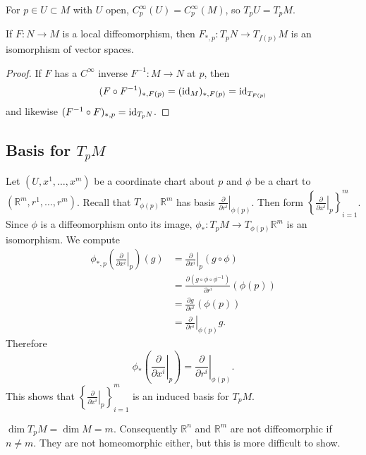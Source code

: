 \begin{remark}
For $p \in U \subset M$ with $U$ open,
$C_p^\infty(U) = C_p^\infty(M)$, so $T_pU = T_pM$.
\end{remark}

\begin{corol}
If $F: N \to M$ is a local diffeomorphism, then
$F_{\ast, p} : T_p N \to T_{f(p)} M$ is an isomorphism of vector spaces.
\end{corol}
\begin{proof}
If $F$ has a $C^\infty$ inverse $F^{-1} : M \to N$ at $p$, then
$$
    (F \circ F^{-1})_{\ast, F(p)}
  = (\mathrm{id}_M)_{\ast, F(p)}
  = \mathrm{id}_{T_{F(p)}}
$$
and likewise $(F^{-1} \circ F)_{\ast, p} = \mathrm{id}_{T_pN}$.
\end{proof}

\subsection{Basis for $T_pM$}
Let $(U, x^1, \dots, x^m)$ be a coordinate chart about $p$
and $\phi$ be a chart to $(\mathbb{R}^m, r^1, \dots, r^m)$.
Recall that $T_{\phi(p)} \mathbb{R}^m$ has basis
$\left.\frac{\partial}{\partial r^i}\right|_{\phi(p)}$.
Then form
$\left\{ \left.\frac{\partial}{\partial x^i}\right|_p \right\}_{i=1}^m$.
Since $\phi$ is a diffeomorphism onto its image,
$\phi_\ast : T_pM \to T_{\phi(p)} \mathbb{R}^m$ is an isomorphism. We
compute
\begin{align*}
   \phi_{\ast,p}
     \left(
       \left.
         \frac{\partial}{\partial x^i}
       \right|_p
     \right)(g)
&= \left.
     \frac{\partial}{\partial x^i}
   \right|_p
     (g \circ \phi) \\
&= \frac{\partial (g \circ \phi \circ \phi^{-1})}
        {\partial r^i}
   (\phi(p)) \\
&= \frac{\partial g}{\partial r^i}(\phi(p)) \\
&= \left.\frac{\partial}{\partial r^i}\right|_{\phi(p)} g.
\end{align*}
Therefore
$$
  \phi_\ast
    \left(
      \left.
        \frac{\partial}{\partial x^i}
      \right|_p
    \right)
= \left.
    \frac{\partial}{\partial r^i}
  \right|_{\phi(p)}.
$$
This shows that
$\left\{ \left.\frac{\partial}{\partial x^i}\right|_p
\right\}_{i=1}^m$
is an induced basis for $T_pM$.

\begin{corol}
$\dim T_p M = \dim M = m$. Consequently
$\mathbb{R}^n$ and $\mathbb{R}^m$ are not diffeomorphic if
$n \neq m$. They are not homeomorphic either, but this is more
difficult to show.
\end{corol}

